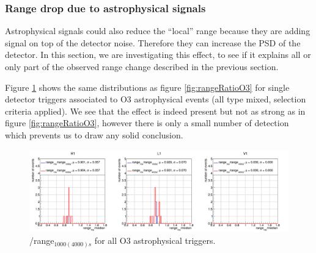 \subsubsection{Range drop due to astrophysical signals}

Astrophysical signals could also reduce the ``local'' range because they are adding signal on top of the detector noise.
Therefore they can increase the PSD of the detector.
In this section, we are investigating this effect, to see if it explains all or only part of the observed range change described in the previous section.

Figure \ref{fig:rangeRatioAstro} shows the same distributions as figure \ref{fig:rangeRatioO3} for single detector triggers associated to O3 astrophysical events (all type mixed, selection criteria applied).
We see that the effect is indeed present but not as strong as in figure \ref{fig:rangeRatioO3}, however there is only a small number of detection which prevents us to draw any solid conclusion.
%
\begin{figure}[H]
  \centering
  \includegraphics[width=\linewidth]{sectionBadTriggers/PSD/Range/range_ratio/cRatioMed_astro.png}
  \caption{\medr{}/range$_{1000(4000)s}$ for all O3 astrophysical triggers.}
  \label{fig:rangeRatioAstro}
\end{figure}

